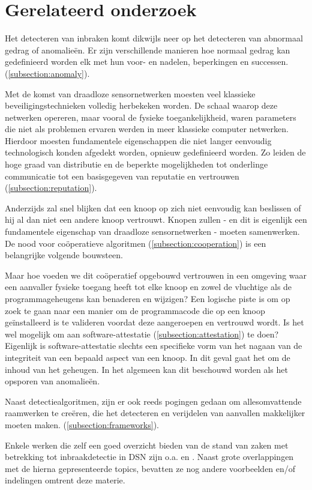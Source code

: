 \section{Gerelateerd onderzoek}
\label{section:related}

Het detecteren van inbraken komt dikwijls neer op het detecteren van abnormaal
gedrag of anomalie\"en. Er zijn verschillende manieren hoe normaal gedrag kan
gedefinieerd worden elk met hun voor- en nadelen, beperkingen en successen.
(\ref{subsection:anomaly}).

Met de komst van draadloze sensornetwerken moesten veel klassieke
beveiligingstechnieken volledig herbekeken worden. De schaal waarop deze
netwerken opereren, maar vooral de fysieke toegankelijkheid, waren parameters
die niet als problemen ervaren werden in meer klassieke computer netwerken.
Hierdoor moesten fundamentele eigenschappen die niet langer eenvoudig
technologisch konden afgedekt worden, opnieuw gedefinieerd worden. Zo leiden de
hoge graad van distributie en de beperkte mogelijkheden tot onderlinge
communicatie tot een basisgegeven van reputatie en vertrouwen
(\ref{subsection:reputation}).

Anderzijds zal snel blijken dat een knoop op zich niet eenvoudig kan beslissen
of hij al dan niet een andere knoop vertrouwt. Knopen zullen - en dit is
eigenlijk een fundamentele eigenschap van draadloze sensornetwerken - moeten
samenwerken. De nood voor co\"operatieve algoritmen
(\ref{subsection:cooperation}) is een belangrijke volgende bouwsteen.

Maar hoe voeden we dit co\"operatief opgebouwd vertrouwen in een omgeving waar
een aanvaller fysieke toegang heeft tot elke knoop en zowel de vluchtige als de
programmageheugens kan benaderen en wijzigen? Een logische piste is om op zoek
te gaan naar een manier om de programmacode die op een knoop ge\"installeerd is
te valideren voordat deze aangeroepen en vertrouwd wordt. Is het wel mogelijk
om aan software-attestatie (\ref{subsection:attestation}) te doen? Eigenlijk is
software-attestatie slechts een specifieke vorm van het nagaan van de
integriteit van een bepaald aspect van een knoop. In dit geval gaat het om de
inhoud van het geheugen. In het algemeen kan dit beschouwd worden als het
opsporen van anomalie\"en.

Naast detectiealgoritmen, zijn er ook reeds pogingen gedaan om allesomvattende
raamwerken te cre\"eren, die het detecteren en verijdelen van aanvallen
makkelijker moeten maken. (\ref{subsection:frameworks}).

Enkele werken die zelf een goed overzicht bieden van de stand van zaken met
betrekking tot inbraakdetectie in DSN zijn o.a. \citep{mishra2004intrusion} en
\citep{alrajeh2013intrusion}. Naast grote overlappingen met de hierna
gepresenteerde topics, bevatten ze nog andere voorbeelden en/of indelingen
omtrent deze materie.






